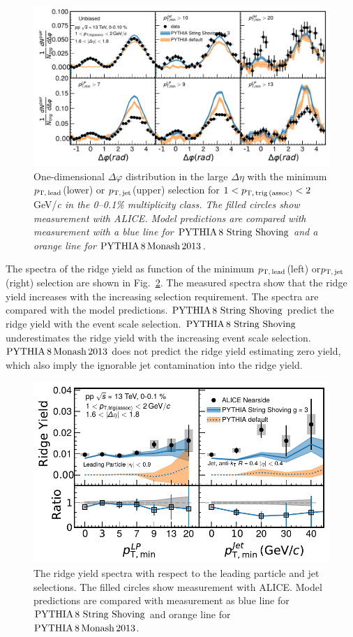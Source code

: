 \begin{figure}[h!]
	\centering
	\includegraphics[width=0.99\linewidth]{./figures/Fig5_PlotDeltaPhiESE.pdf}
	\caption{ One-dimensional $\Delta\varphi$ distribution in the large $\Delta\eta$ with the minimum $p_\mathrm{T,\,lead}$(lower) or $p_\mathrm{T,\,jet}$(upper) selection for $1<p_\mathrm{T,\,trig\,(assoc)}<2$ GeV/\it{c}\rm{} in the 0--0.1\% multiplicity class. The filled circles show measurement with ALICE. Model predictions are compared with measurement with a blue line for $\mathrm{PYTHIA}\,8~\mathrm{String}~\mathrm{Shoving}$  and a orange line for $\mathrm{PYTHIA}\,8\,\mathrm{Monash}\,2013$.}
	\label{fig:PlotDeltaPhiESE}
\end{figure}

The spectra of the ridge yield as function of the minimum $p_\mathrm{T,\,lead}$(left) or$p_\mathrm{T,\,jet}$(right) selection are shown in Fig.~\ref{fig:RidgeYield_ESE}. The measured spectra show that the ridge yield increases with the increasing selection requirement. The spectra are compared with the model predictions. $\mathrm{PYTHIA}\,8~\mathrm{String}~\mathrm{Shoving}$ predict the ridge yield with the event scale selection. $\mathrm{PYTHIA}\,8~\mathrm{String}~\mathrm{Shoving}$ underestimates the ridge yield with the increasing event scale selection. $\mathrm{PYTHIA}\,8\,\mathrm{Monash}\,2013$ does not predict the ridge yield estimating zero yield, which also imply the ignorable jet contamination into the ridge yield.

\begin{figure}[h!]
	\centering
	\includegraphics[width=0.99\linewidth]{./figures/Fig6_RidgeYieldESE.pdf}
	\caption{The ridge yield spectra with respect to the leading particle and jet selections. The filled circles show measurement with ALICE. Model predictions are compared with measurement as blue line for $\mathrm{PYTHIA}\,8~\mathrm{String}~\mathrm{Shoving}$ and orange line for $\mathrm{PYTHIA}\,8\,\mathrm{Monash}\,2013$.}
	\label{fig:RidgeYield_ESE}
\end{figure}



